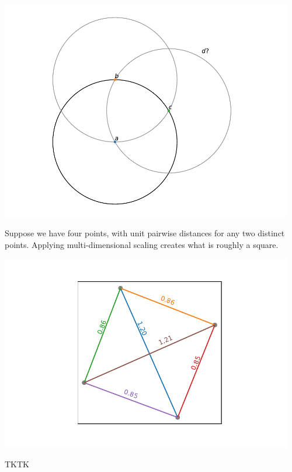 \begin{center}
    \includegraphics[width = 0.96\textwidth]{figures/specialplots/mds-circles.pdf}
\end{center}


Suppose we have four points, with unit pairwise distances for any two distinct points. Applying multi-dimensional scaling creates what is roughly a square.

\begin{center}
    \includegraphics[width = 0.96\textwidth]{Images/MDS_social.pdf}
\end{center}

TKTK